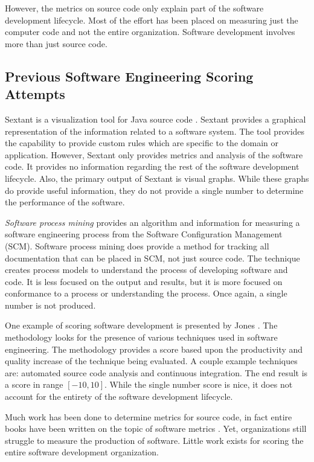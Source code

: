 \documentclass[SDSUThesis.tex]{subfiles}
\begin{document}
However, the metrics on source code only explain part of the software development lifecycle.  
Most of the effort has been placed on measuring just the computer code and not the entire organization.  Software
development involves more than just source code.


\subsection{Previous Software Engineering Scoring Attempts}

Sextant is a visualization tool for Java source code \cite{Winter2013}.  Sextant provides a graphical representation of the information related 
to a software system.  The tool provides the capability to provide custom rules which are specific to the domain or application.  However,
Sextant only provides metrics and analysis of the software code.  It provides no information regarding the rest of the 
software development lifecycle.  Also, the primary output of Sextant is visual graphs.  While these graphs do provide
useful information, they do not provide a single number to determine the performance of the software.

\textit{Software process mining} \cite{Rubin2007} provides
an algorithm and information for measuring a software engineering process from
the Software Configuration Management (SCM). Software process mining does provide a method for tracking all 
documentation that can be placed in SCM, not just source code.  The technique creates process models 
to understand the process of developing software and code. It is less focused on the output and results,
but it is more focused on conformance to a process or understanding the process. Once again, a single number is not produced.

One example of scoring software development is presented by Jones \cite{Jones2012}. The methodology looks
for the presence of various techniques used in software engineering.  The methodology provides a score based upon the 
productivity and quality increase of the technique being evaluated.  A couple example techniques are: 
automated source code analysis and continuous integration.  The end result is a score in range $[-10,10]$. 
While the single number score is nice, it does not account for the entirety of the software development lifecycle.

Much work has been done to determine metrics for source code, in fact 
entire books have been written on the topic of software metrics \cite{Jones1996, Putnam2013}. Yet, 
organizations still struggle to measure the production of software.
Little work exists
for scoring the entire software development organization. 
\end{document}
